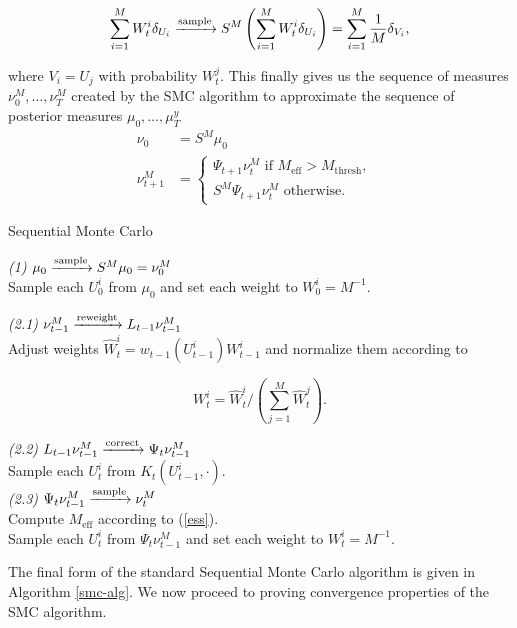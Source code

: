\begin{equation*}
  \sum_{i=1}^MW^i_t\delta_{U_i} \xrightarrow{\text{sample}} S^M\left(\sum_{i=1}^MW^i_t\delta_{U_i}\right) = \sum_{i=1}^M\frac1M\delta_{V_i},
\end{equation*}

where $V_i = U_j$ with probability $W^j_t$. This finally gives us the sequence of measures $\nu^M_0, \ldots, \nu^M_T$ created by the SMC algorithm to approximate the sequence of posterior measures $\mu_0, \ldots, \mu^y_T$
\begin{align*}
  \nu_0 &= S^M\mu_0\\
  \nu_{t+1}^M &= \begin{cases}
    \Psi_{t+1}\nu^M_t\text{\ \ \ \ \ \ \ \ if $M_\text{eff} > M_\text{thresh},$ }\\
    S^M\Psi_{t+1}\nu^M_t\text{\ \ \ \ otherwise. }
  \end{cases}
\end{align*}


\begin{algorithm}[t!]
  \caption{Sequential Monte Carlo}
  \label{smc-alg}
  \textit{(1) $\mu_0 \xrightarrow{\text{sample}} S^M\mu_0 = \nu^M_0$}\\
  Sample each $U^i_0$ from $\mu_0$ and
  set each weight to $W^i_0 = M^{-1}$. \\
  \;
   {
    \textit{(2.1) $\nu^M_{t-1}\xrightarrow{\text{reweight}} L_{t-1}\nu^M_{t-1}$}\\
    Adjust weights $\hat W^i_t = w_{t-1}(U^i_{t-1})W^i_{t-1}$ and normalize them according to

    \begin{equation*}
      W^i_t = \hat W^i_t \Big/ \left(\sum_{j=1}^M\hat W_t^j\right).
    \end{equation*}
    
    \textit{(2.2) $L_{t-1}\nu^M_{t-1} \xrightarrow{\text{correct}} \Psi_t\nu^M_{t-1}$ }\\
    Sample each $U^i_t$ from $K_t(U^i_{t-1}, \cdot)$.\\
    \;
    \textit{(2.3) $\Psi_t\nu^M_{t-1} \xrightarrow{\text{sample}} \nu^M_t$}\\
    Compute $M_\text{eff}$ according to (\ref{ess}).\\
     {
      Sample each $U^i_t$ from $\Psi_t\nu^M_{t-1}$ and set each weight to $W^i_t = M^{-1}$.
    }
  }
\end{algorithm}

The final form of the standard Sequential Monte Carlo algorithm is given in Algorithm \ref{smc-alg}. We now proceed to proving convergence properties of the SMC algorithm.

